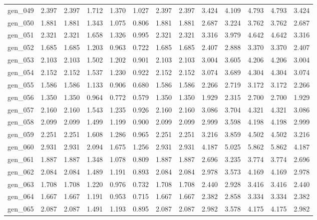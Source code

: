 \begin{tabular}{lrrrrrrrrrrrr}
gen\_049 &  2.397 &  2.397 &  1.712 &  1.370 &  1.027 &  2.397 &  2.397 &  3.424 &  4.109 &  4.793 &  4.793 &  3.424 \\
gen\_050 &  1.881 &  1.881 &  1.343 &  1.075 &  0.806 &  1.881 &  1.881 &  2.687 &  3.224 &  3.762 &  3.762 &  2.687 \\
gen\_051 &  2.321 &  2.321 &  1.658 &  1.326 &  0.995 &  2.321 &  2.321 &  3.316 &  3.979 &  4.642 &  4.642 &  3.316 \\
gen\_052 &  1.685 &  1.685 &  1.203 &  0.963 &  0.722 &  1.685 &  1.685 &  2.407 &  2.888 &  3.370 &  3.370 &  2.407 \\
gen\_053 &  2.103 &  2.103 &  1.502 &  1.202 &  0.901 &  2.103 &  2.103 &  3.004 &  3.605 &  4.206 &  4.206 &  3.004 \\
gen\_054 &  2.152 &  2.152 &  1.537 &  1.230 &  0.922 &  2.152 &  2.152 &  3.074 &  3.689 &  4.304 &  4.304 &  3.074 \\
gen\_055 &  1.586 &  1.586 &  1.133 &  0.906 &  0.680 &  1.586 &  1.586 &  2.266 &  2.719 &  3.172 &  3.172 &  2.266 \\
gen\_056 &  1.350 &  1.350 &  0.964 &  0.772 &  0.579 &  1.350 &  1.350 &  1.929 &  2.315 &  2.700 &  2.700 &  1.929 \\
gen\_057 &  2.160 &  2.160 &  1.543 &  1.235 &  0.926 &  2.160 &  2.160 &  3.086 &  3.704 &  4.321 &  4.321 &  3.086 \\
gen\_058 &  2.099 &  2.099 &  1.499 &  1.199 &  0.900 &  2.099 &  2.099 &  2.999 &  3.598 &  4.198 &  4.198 &  2.999 \\
gen\_059 &  2.251 &  2.251 &  1.608 &  1.286 &  0.965 &  2.251 &  2.251 &  3.216 &  3.859 &  4.502 &  4.502 &  3.216 \\
gen\_060 &  2.931 &  2.931 &  2.094 &  1.675 &  1.256 &  2.931 &  2.931 &  4.187 &  5.025 &  5.862 &  5.862 &  4.187 \\
gen\_061 &  1.887 &  1.887 &  1.348 &  1.078 &  0.809 &  1.887 &  1.887 &  2.696 &  3.235 &  3.774 &  3.774 &  2.696 \\
gen\_062 &  2.084 &  2.084 &  1.489 &  1.191 &  0.893 &  2.084 &  2.084 &  2.978 &  3.573 &  4.169 &  4.169 &  2.978 \\
gen\_063 &  1.708 &  1.708 &  1.220 &  0.976 &  0.732 &  1.708 &  1.708 &  2.440 &  2.928 &  3.416 &  3.416 &  2.440 \\
gen\_064 &  1.667 &  1.667 &  1.191 &  0.953 &  0.715 &  1.667 &  1.667 &  2.382 &  2.858 &  3.334 &  3.334 &  2.382 \\
gen\_065 &  2.087 &  2.087 &  1.491 &  1.193 &  0.895 &  2.087 &  2.087 &  2.982 &  3.578 &  4.175 &  4.175 &  2.982 \\

\end{tabular}
